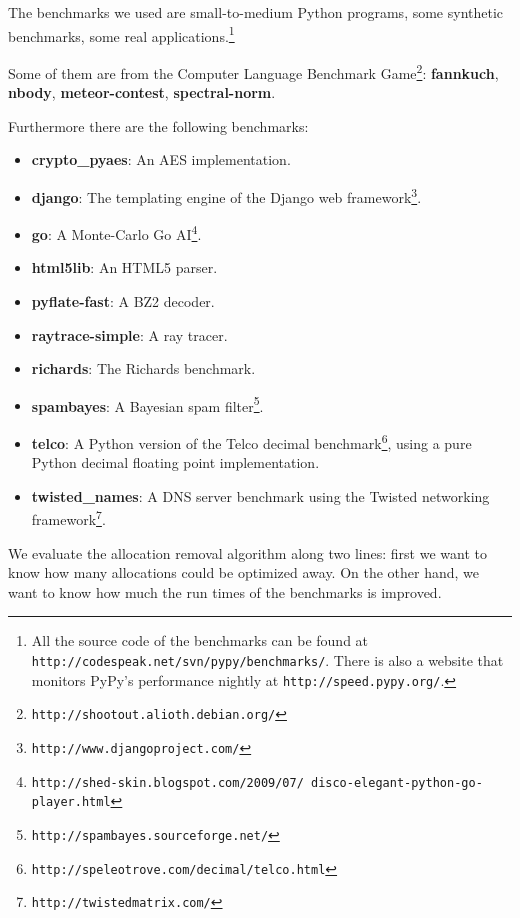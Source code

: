 \documentclass[preprint]{sigplanconf}
\begin{document}
The
benchmarks we used are small-to-medium Python programs, some synthetic
benchmarks, some real applications.\footnote{All the source code of the
benchmarks can be found at \texttt{http://codespeak.net/svn/pypy/benchmarks/}.
There is also a website that monitors PyPy's performance nightly at
\texttt{http://speed.pypy.org/}.}

Some of them are from the Computer Language Benchmark
Game\footnote{\texttt{http://shootout.alioth.debian.org/}}: \textbf{fannkuch},
\textbf{nbody}, \textbf{meteor-contest}, \textbf{spectral-norm}.

Furthermore there are the following benchmarks:
\begin{itemize}
    \item \textbf{crypto\_pyaes}: An AES implementation.
    \item \textbf{django}: The templating engine of the Django web
    framework\footnote{\texttt{http://www.djangoproject.com/}}.
    \item \textbf{go}: A Monte-Carlo Go
    AI\footnote{\texttt{http://shed-skin.blogspot.com/2009/07/ disco-elegant-python-go-player.html}}.
    \item \textbf{html5lib}: An HTML5 parser.
    \item \textbf{pyflate-fast}: A BZ2 decoder.
    \item \textbf{raytrace-simple}: A ray tracer.
    \item \textbf{richards}: The Richards benchmark.
    \item \textbf{spambayes}: A Bayesian spam filter\footnote{\texttt{http://spambayes.sourceforge.net/}}.
    \item \textbf{telco}: A Python version of the Telco decimal
    benchmark\footnote{\texttt{http://speleotrove.com/decimal/telco.html}},
    using a pure Python decimal floating point implementation.
    \item \textbf{twisted\_names}: A DNS server benchmark using the Twisted networking
    framework\footnote{\texttt{http://twistedmatrix.com/}}.
\end{itemize}


We evaluate the allocation removal algorithm along two lines: first we want to
know how many allocations could be optimized away. On the other hand, we want
to know how much the run times of the benchmarks is improved.
\end{document}

